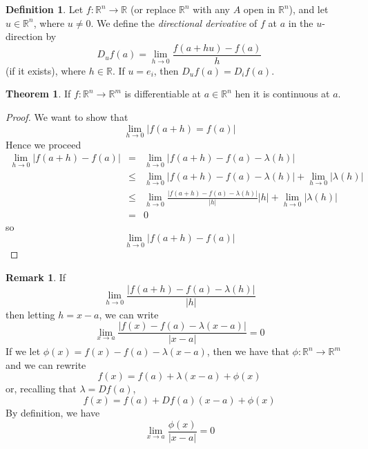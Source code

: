 \documentclass[a4paper,14pt]{extarticle}
\theoremstyle{definition}
\newtheorem*{theorem}{Theorem}
\newtheorem*{definition}{Definition}
\newtheorem*{remark}{Remark}
\begin{document}
\begin{definition}
	Let $f:\mathbb{R}^n\rightarrow\mathbb{R}$ (or replace $\mathbb{R}^n$ with any $A$ open in $\mathbb{R}^n$), and let $u\in\mathbb{R}^n$, where $u\neq0$. We define the
	\emph{directional derivative} of $f$ at $a$ in the $u$-direction by
	\[D_uf(a)=\lim\limits_{h\to0}\frac{f(a+hu)-f(a)}{h}\] (if it exists), where $h\in\mathbb{R}$. If $u=e_i$, then $D_uf(a)=D_if(a)$.
\end{definition}

\begin{theorem}
	If $f:\mathbb{R}^n\rightarrow\mathbb{R}^m$ is differentiable at $a\in\mathbb{R}^n$  hen it is continuous at $a$.
\end{theorem}

\begin{proof}
	We want to show that \[\lim\limits_{h\to0}|f(a+h)=f(a)|\] Hence we proceed
	\begin{eqnarray*}
		\lim\limits_{h\to0}|f(a+h)-f(a)|&=&\lim\limits_{h\to0}|f(a+h)-f(a)-\lambda(h)|\\
				&\leq&\lim\limits_{h\to0}|f(a+h)-f(a)-\lambda(h)|+\lim\limits_{h\to0}|\lambda(h)|\\
				&\leq&\lim\limits_{h\to0}\frac{|f(a+h)-f(a)-\lambda(h)|}{|h|}|h|+\lim\limits_{h\to0}|\lambda(h)|\\
				&=&0
	\end{eqnarray*}
	so \[\lim\limits_{h\to0}|f(a+h)-f(a)|\]
\end{proof}

\begin{remark}
	If \[\lim\limits_{h\to0}\frac{|f(a+h)-f(a)-\lambda(h)|}{|h|}\] then letting $h=x-a$, we can write \[\lim\limits_{x\to a}\frac{|f(x)-f(a)-\lambda(x-a)|}{|x-a|}=0\]
	If we let $\phi(x)=f(x)-f(a)-\lambda(x-a)$, then we have that $\phi:\mathbb{R}^n\rightarrow\mathbb{R}^m$ and we can rewrite
	\[f(x)=f(a)+\lambda(x-a)+\phi(x)\] or, recalling that $\lambda=Df(a)$, \[f(x)=f(a)+Df(a)(x-a)+\phi(x)\] By definition, we have
	\[\lim\limits_{x\to a}\frac{\phi(x)}{|x-a|}=0\]
\end{remark}
\end{document}
